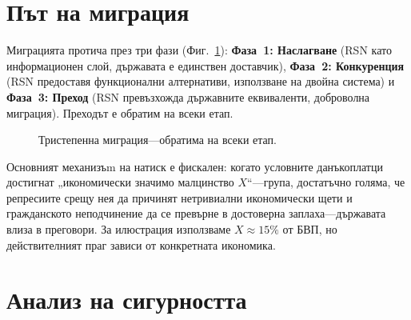 \documentclass[11pt,a4paper,twocolumn]{article}
\begin{document}
\section{Път на миграция}

Миграцията протича през три фази (Фиг.~\ref{fig:migration}): \textbf{Фаза~1: Наслагване} (RSN като информационен слой, държавата е единствен доставчик), \textbf{Фаза~2: Конкуренция} (RSN предоставя функционални алтернативи, използване на двойна система) и \textbf{Фаза~3: Преход} (RSN превъзхожда държавните еквиваленти, доброволна миграция). Преходът е обратим на всеки етап.

\begin{figure}[ht]
\centering
{}
\caption{Тристепенна миграция---обратима на всеки етап.}
\label{fig:migration}
\end{figure}

Основният механизъm на натиск е фискален: когато условните данъкоплатци достигнат „икономически значимо малцинство $X$“---група, достатъчно голяма, че репресиите срещу нея да причинят нетривиални икономически щети и гражданското неподчинение да се превърне в достоверна заплаха---държавата влиза в преговори. За илюстрация използваме $X \approx 15\%$ от БВП, но действителният праг зависи от конкретната икономика.

\section{Анализ на сигурността}
\end{document}
